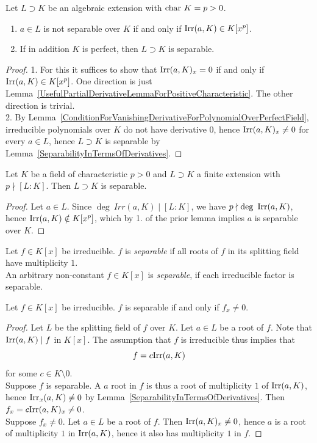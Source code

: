 \begin{lemma}\label{AlgebraicExtensionsOverPerfectFieldsAreSeparable}
    Let $L\supset K$ be an algebraic extension with $\mathrm{char} \ K = p>0$. 
    \begin{enumerate}
        \item $a\in L$ is not separable over $K$ if and only if $\mathrm{Irr}(a,K) \in K[x^p]$.
        \item If in addition $K$ is perfect, then $L\supset K$ is separable.  
    \end{enumerate}
\end{lemma}
\begin{proof}
    1. For this it suffices to show that $\mathrm{Irr}(a,K)_x = 0$ if and only if $\mathrm{Irr}(a,K)\in K[x^p]$. One direction is just Lemma~\ref{UsefulPartialDerivativeLemmaForPositiveCharacteristic}. The other direction is trivial.\\
    2. By Lemma~\ref{ConditionForVanishingDerivativeForPolynomialOverPerfectField}, irreducible polynomials over $K$ do not have derivative $0$, hence $\mathrm{Irr}(a,K)_x \neq 0$ for every $a\in L$, hence $L\supset K$ is separable by Lemma~\ref{SeparabilityInTermsOfDerivatives}.
\end{proof}
\begin{proposition}
    Let $K$ be a field of characteristic $p>0$ and $L\supset K$ a finite extension with $p\nmid [L : K]$. Then $L\supset K$ is separable. 
\end{proposition}
\begin{proof}
    Let $a\in L$. Since $\deg \ Irr(a,K) \mid [L : K]$, we have $p\nmid \deg \ \mathrm{Irr}(a,K)$, hence $\mathrm{Irr}(a,K)\notin K[x^p]$, which by 1. of the prior lemma implies $a$ is separable over $K$. 
\end{proof}
\begin{definition}
    Let $f\in K[x]$ be irreducible. $f$ is \emph{separable} if all roots of $f$ in its splitting field have multiplicity $1$.\\
    An arbitrary non-constant $f\in K[x]$ is \emph{separable}, if each irreducible factor is separable.  
\end{definition}

\begin{lemma}
    Let $f\in K[x]$ be irreducible. $f$ is separable if and only if $f_x \neq 0$. 
\end{lemma}
\begin{proof}
    Let $L$ be the splitting field of $f$ over $K$. Let $a\in L$ be a root of $f$. Note that $\mathrm{Irr}(a,K)\mid f$ in $K[x]$. The assumption that $f$ is irreducible thus implies that 
    $$
        f = c\mathrm{Irr}(a,K)
    $$ 
    for some $c\in K\setminus 0$.\\
    Suppose $f$ is separable. A $a$ root in $f$ is thus a root of multiplicity $1$ of $\mathrm{Irr}(a,K)$, hence $\mathrm{Irr}_x(a,K)\neq 0$ by Lemma~\ref{SeparabilityInTermsOfDerivatives}. Then $f_x = c\mathrm{Irr}(a,K)_x \neq 0$.\\
    Suppose $f_x\neq 0$. Let $a\in L$ be a root of $f$. Then $\mathrm{Irr}(a,K)_x\neq 0$, hence $a$ is a root of multiplicity $1$ in $\mathrm{Irr}(a,K)$, hence it also has multiplicity $1$ in $f$.  
\end{proof}

